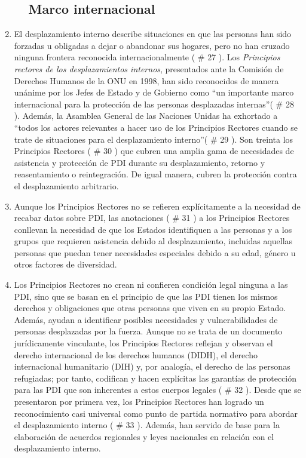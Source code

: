 \documentclass[
]{book}
\begin{document}
\begin{enumerate}
\begin{enumerate}
{    \subsection{Marco internacional}\label{marco-internacional}}
  \end{enumerate}
\item
  El desplazamiento interno describe situaciones en que las personas han sido forzadas u obligadas a dejar o abandonar sus hogares, pero no han cruzado ninguna frontera reconocida internacionalmente (
  \# 27
  ). Los \emph{Principios rectores de los desplazamientos internos}, presentados ante la Comisión de Derechos Humanos de la ONU en 1998, han sido reconocidos de manera unánime por los Jefes de Estado y de Gobierno como ``un importante marco internacional para la protección de las personas desplazadas internas''(
  \# 28
  ). Además, la Asamblea General de las Naciones Unidas ha exhortado a ``todos los actores relevantes a hacer uso de los Principios Rectores cuando se trate de situaciones para el desplazamiento interno''(
  \# 29
  ). Son treinta los Principios Rectores (
  \# 30
  ) que cubren una amplia gama de necesidades de asistencia y protección de PDI durante su desplazamiento, retorno y reasentamiento o reintegración. De igual manera, cubren la protección contra el desplazamiento arbitrario.
\item
  Aunque los Principios Rectores no se refieren explícitamente a la necesidad de recabar datos sobre PDI, las anotaciones (
  \# 31
  ) a los Principios Rectores conllevan la necesidad de que los Estados identifiquen a las personas y a los grupos que requieren asistencia debido al desplazamiento, incluidas aquellas personas que puedan tener necesidades especiales debido a su edad, género u otros factores de diversidad.
\item
  Los Principios Rectores no crean ni confieren condición legal ninguna a las PDI, sino que se basan en el principio de que las PDI tienen los mismos derechos y obligaciones que otras personas que viven en su propio Estado. Además, ayudan a identificar posibles necesidades y vulnerabilidades de personas desplazadas por la fuerza. Aunque no se trata de un documento jurídicamente vinculante, los Principios Rectores reflejan y observan el derecho internacional de los derechos humanos (DIDH), el derecho internacional humanitario (DIH) y, por analogía, el derecho de las personas refugiadas; por tanto, codifican y hacen explícitas las garantías de protección para las PDI que son inherentes a estos cuerpos legales (
  \# 32
  ). Desde que se presentaron por primera vez, los Principios Rectores han logrado un reconocimiento casi universal como punto de partida normativo para abordar el desplazamiento interno (
  \# 33
  ). Además, han servido de base para la elaboración de acuerdos regionales y leyes nacionales en relación con el desplazamiento interno.


\end{enumerate}
\end{document}
